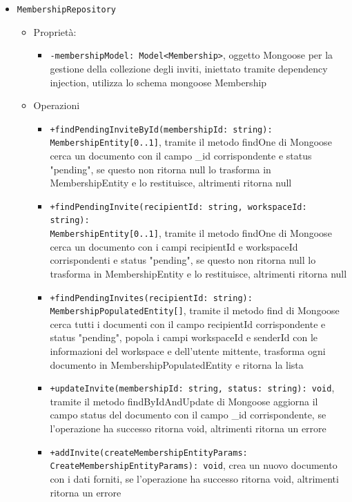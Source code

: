 \documentclass[a4paper, 11pt]{article}
\begin{document}
\begin{itemize}
\begin{itemize}
			

			\item \texttt{MembershipRepository}
				\begin{itemize}
					\item Proprietà:
						\begin{itemize}
							\item \texttt{-membershipModel: Model<Membership>}, oggetto Mongoose per la gestione della collezione degli inviti, iniettato tramite dependency injection, utilizza lo schema mongoose Membership
						\end{itemize}
					\item Operazioni
						\begin{itemize}
							\item \texttt{+findPendingInviteById(membershipId: string): MembershipEntity[0..1]}, tramite il metodo findOne di Mongoose cerca un documento con il campo \_id corrispondente e status "pending", se questo non ritorna null lo trasforma in MembershipEntity e lo restituisce, altrimenti ritorna null
							\item \texttt{+findPendingInvite(recipientId: string, workspaceId: string):}\\ \texttt{MembershipEntity[0..1]}, tramite il metodo findOne di Mongoose cerca un documento con i campi recipientId e workspaceId corrispondenti e status "pending", se questo non ritorna null lo trasforma in MembershipEntity e lo restituisce, altrimenti ritorna null
							\item \texttt{+findPendingInvites(recipientId: string): MembershipPopulatedEntity[]}, tramite il metodo find di Mongoose cerca tutti i documenti con il campo recipientId corrispondente e status "pending", popola i campi workspaceId e senderId con le informazioni del workspace e dell'utente mittente, trasforma ogni documento in MembershipPopulatedEntity e ritorna la lista
							\item \texttt{+updateInvite(membershipId: string, status: string): void}, tramite il metodo findByIdAndUpdate di Mongoose aggiorna il campo status del documento con il campo \_id corrispondente, se l'operazione ha successo ritorna void, altrimenti ritorna un errore
							\item \texttt{+addInvite(createMembershipEntityParams: CreateMembershipEntityParams): void}, crea un nuovo documento con i dati forniti, se l'operazione ha successo ritorna void, altrimenti ritorna un errore
						\end{itemize}
				\end{itemize}
		\end{itemize}
\end{itemize}
\end{document}
